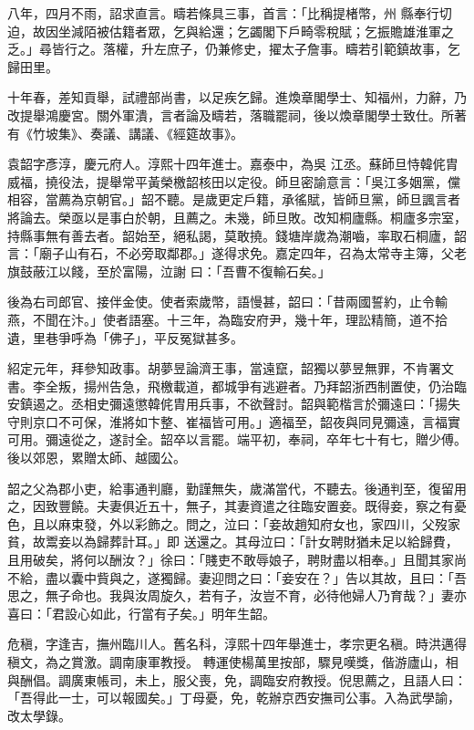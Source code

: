 \begin{pinyinscope}
 八年，四月不雨，詔求直言。疇若條具三事，首言：「比稱提楮幣，州
 縣奉行切迫，故因坐減陌被估籍者眾，乞與給還；乞蠲閣下戶畸零稅賦；乞振贍雄淮軍之乏。」尋皆行之。落權，升左庶子，仍兼修史，擢太子詹事。疇若引範鎮故事，乞歸田里。



 十年春，差知貢舉，試禮部尚書，以足疾乞歸。進煥章閣學士、知福州，力辭，乃改提舉鴻慶宮。關外軍潰，言者論及疇若，落職罷祠，後以煥章閣學士致仕。所著有《竹坡集》、奏議、講議、《經筵故事》。



 袁韶字彥淳，慶元府人。淳熙十四年進士。嘉泰中，為吳
 江丞。蘇師旦恃韓侂胄威福，撓役法，提舉常平黃榮檄韶核田以定役。師旦密諭意言：「吳江多姻黨，儻相容，當薦為京朝官。」韶不聽。是歲更定戶籍，承徭賦，皆師旦黨，師旦諷言者將論去。榮亟以是事白於朝，且薦之。未幾，師旦敗。改知桐廬縣。桐廬多宗室，持縣事無有善去者。韶始至，絕私謁，莫敢撓。錢塘岸歲為潮嚙，率取石桐廬，韶言：「廟子山有石，不必旁取鄰郡。」遂得求免。嘉定四年，召為太常寺主簿，父老旗鼓蔽江以餞，至於富陽，泣謝
 曰：「吾曹不復輸石矣。」



 後為右司郎官、接伴金使。使者索歲幣，語慢甚，韶曰：「昔兩國誓約，止令輸燕，不聞在汴。」使者語塞。十三年，為臨安府尹，幾十年，理訟精簡，道不拾遺，里巷爭呼為「佛子」，平反冤獄甚多。



 紹定元年，拜參知政事。胡夢昱論濟王事，當遠竄，韶獨以夢昱無罪，不肯署文書。李全叛，揚州告急，飛檄載道，都城爭有逃避者。乃拜韶浙西制置使，仍治臨安鎮遏之。丞相史彌遠懲韓侂胄用兵事，不欲聲討。韶與範楷言於彌遠曰：「揚失
 守則京口不可保，淮將如卞整、崔福皆可用。」適福至，韶夜與同見彌遠，言福實可用。彌遠從之，遂討全。韶卒以言罷。端平初，奉祠，卒年七十有七，贈少傅。後以郊恩，累贈太師、越國公。



 韶之父為郡小吏，給事通判廳，勤謹無失，歲滿當代，不聽去。後通判至，復留用之，因致豐饒。夫妻俱近五十，無子，其妻資遣之往臨安置妾。既得妾，察之有憂色，且以麻束發，外以彩飾之。問之，泣曰：「妾故趙知府女也，家四川，父歿家貧，故鬻妾以為歸葬計耳。」即
 送還之。其母泣曰：「計女聘財猶未足以給歸費，且用破矣，將何以酬汝？」徐曰：「賤吏不敢辱娘子，聘財盡以相奉。」且聞其家尚不給，盡以囊中貲與之，遂獨歸。妻迎問之曰：「妾安在？」告以其故，且曰：「吾思之，無子命也。我與汝周旋久，若有子，汝豈不育，必待他婦人乃育哉？」妻亦喜曰：「君設心如此，行當有子矣。」明年生韶。



 危稹，字逢吉，撫州臨川人。舊名科，淳熙十四年舉進士，孝宗更名稹。時洪邁得稹文，為之賞激。調南康軍教授。
 轉運使楊萬里按部，驟見嘆獎，偕游廬山，相與酬倡。調廣東帳司，未上，服父喪，免，調臨安府教授。倪思薦之，且語人曰：「吾得此一士，可以報國矣。」丁母憂，免，乾辦京西安撫司公事。入為武學諭，改太學錄。




\end{pinyinscope}
